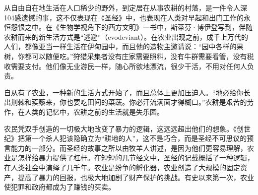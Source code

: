 从自由自在地生活在人口稀少的野外，到定居在从事农耕的村落，是一件令人深104感遗憾的事，这不仅表现在《圣经》中，也表现在人类对早起和出门工作的永恒怨恨之中。在《生物学视角下的西方文明》一书中，斯蒂芬·博伊登写到，伴随农耕而来的新生活方式是“逃避”（evodeviant）。在农业出现之前，成千上万代的人们，都像亚当一样生活在伊甸园中，而且他的造物主邀请说：“园中各样的果树，你都可以随便吃。”狩猎采集者没有庄家需要照料，没有牛群需要看管，没有税收需要支付。他们像无业游民一样，随心所欲地漂流，很少干活，不用对任何人负责。

自从有了农业，一种新的生活方式开始了，而且总体上更加压迫人。“地必给你长出荆棘和蒺藜来，你也要吃田间的菜蔬。你必汗流满面才得糊口。”农耕是艰苦的劳作，在人类的记忆中，农耕之前的生活就是失乐园。

农民凭双手创造的一切极大地改变了暴力的逻辑，这远远超出他们的想象。《创世纪》把第一个杀人犯该隐确立为“耕地的人”，这不是巧合，而是圣经不可思议的预言能力的一部分。而圣经的故事之所以由牧羊人讲述，是因为他们更容易理解，农业是怎样给暴力提供了杠杆。在短短的几节经文中，圣经的记载概括了一种逻辑，在人类社会中演绎了几千年。农业是纷争的孵化器，农业创造了大规模的固定资产，提高了暴力的回报，也极大地加剧了财产保护的挑战。有史以来第一次，农业使犯罪和政府都成为了赚钱的买卖。